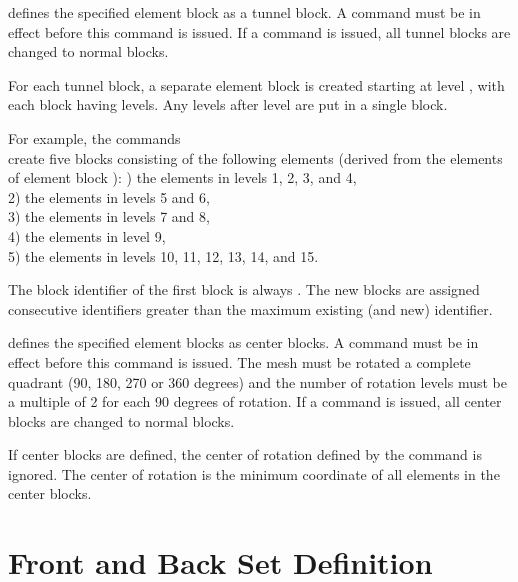  {
 defines the specified element block as a
tunnel block. A  command must be in effect before this
command is issued. If a  command is issued, all tunnel
blocks are changed to normal blocks.

For each tunnel block, a separate  element block is created
starting at level , with each block having 
levels. Any levels after level  are put in a single block.

For example, the commands
\cenlinesbegin
{} \\
\cenlinesend
create five blocks consisting of the following  elements
(derived from the  elements of element block ):
) the elements in levels 1, 2, 3, and 4, \\
2) the elements in levels 5 and 6, \\
3) the elements in levels 7 and 8, \\
4) the elements in level 9, \\
5) the elements in levels 10, 11, 12, 13, 14, and 15.
\cenlinesend

The block identifier of the first block is always . The new
blocks are assigned consecutive identifiers greater than the maximum
existing (and new) identifier.
}

 {
 defines the specified element blocks
as center blocks. A
 command must be in effect before this command is issued.
The mesh must be rotated a complete quadrant (90, 180, 270 or 360
degrees) and the number of rotation levels must be a multiple of 2 for
each 90 degrees of rotation. If a \cmd{TRANSLATE} command is issued, all
center blocks are changed to normal blocks.

If center blocks are defined, the center of rotation defined by the
\cmd{ROTATE} command is ignored. The center of rotation is the minimum
coordinate of all elements in the center blocks.
}

\newpage
\section{Front and Back Set Definition}
\label{cmd:setdef}

